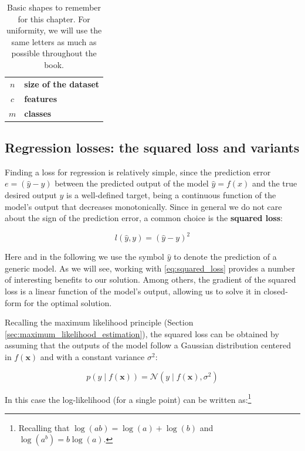 \begin{table}[t]
\centering
\caption{Basic shapes to remember for this chapter. For uniformity, we will use the same letters as much as possible throughout the book.}
\begin{tabular}{@{}cl@{}}
\toprule
 $n$ & \textbf{size of the dataset} \\ $c$ & \textbf{features} \\ $m$ & \textbf{classes}\\ \midrule
\end{tabular}
\label{tab:shapes}
\end{table}

\subsection{Regression losses: the squared loss and variants}

Finding a loss for regression is relatively simple, since the prediction error $e = (\hat{y} - y)$ between the predicted output of the model $\hat{y} = f(x)$ and the true desired output $y$ is a well-defined target, being a continuous function of the model’s output that decreases monotonically. Since in general we do not care about the sign of the prediction error, a common choice is the \textbf{squared loss}:

\begin{equation}
    l(\hat{y},y)=(\hat{y}-y)^2
    \label{eq:squared_loss}
\end{equation}

Here and in the following we use the symbol $\hat{y}$ to denote the prediction of a generic model. As we will see, working with \eqref{eq:squared_loss} provides a number of interesting benefits to our solution. Among others, the gradient of the squared loss is a linear function of the model’s output, allowing us to solve it in closed-form for the optimal solution. 

Recalling the maximum likelihood principle (Section \ref{sec:maximum_likelihood_estimation}), the squared loss can be obtained by assuming that the outputs of the model follow a Gaussian distribution centered in $f(\mathbf{x})$ and with a constant variance $\sigma^2$:

$$
p(y \;\vert\; f(\mathbf{x}))=\mathcal{N}(y\;\vert\;f(\mathbf{x}), \sigma^2)
$$

In this case the log-likelihood (for a single point) can be written as:\footnote{Recalling that $\log(ab)=\log(a)+\log(b)$ and $\log(a^b)=b\log(a)$.}

